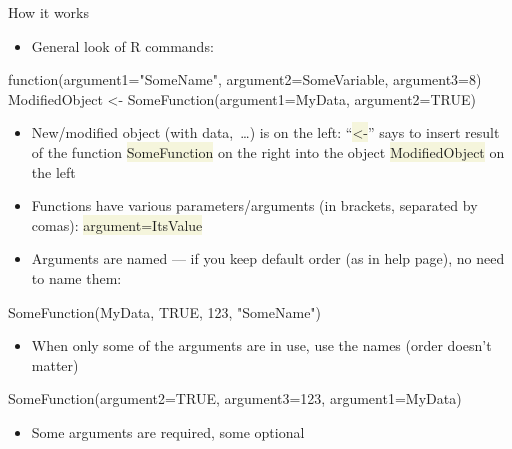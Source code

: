 \documentclass[compress, xelatex, 11pt, xcolor=svgnames, aspectratio=169,
	hyperref={
		bookmarks=true,
		unicode=true,
		colorlinks=true,
		pdftitle={Molecular data in R},
		plainpages=false,
		pdfauthor={Vojtech Zeisek},
		pdfsubject={Course about phylogeny and evolution in R},
		pdfcreator={XeLaTeX},
		pdfkeywords={R, evolution, phylogeny, molecular data},
		linkcolor=Crimson, %
		anchorcolor=Magenta, %
		citecolor=Magenta, %
		filecolor=Magenta, %
		menucolor=Magenta, %
		urlcolor=DodgerBlue, %
		},
	url={hyphens, lowtilde} %
	]{beamer}
\renewcommand{\texttt}[1]{\colorbox{Beige}{{\ttfamily #1}}}
\begin{document}
\begin{frame}[fragile]{How it works}
	\begin{itemize}
		\item General look of R commands:
	\end{itemize}
	\begin{spluscode}
    function(argument1="SomeName", argument2=SomeVariable, argument3=8)
    ModifiedObject <- SomeFunction(argument1=MyData, argument2=TRUE)
	\end{spluscode}
	\begin{itemize}
		\item New/modified object (with data,~\ldots) is on the left: \enquote{\texttt{<-}} says to insert result of the function \texttt{SomeFunction} on the right into the object \texttt{ModifiedObject} on the left
		\item Functions have various parameters/arguments (in brackets, separated by comas): \texttt{argument=ItsValue}
		\item Arguments are named --- if you keep default order (as in help page), no need to name them:
	\end{itemize}
	\begin{spluscode}
    SomeFunction(MyData, TRUE, 123, "SomeName")
	\end{spluscode}
	\begin{itemize}
		\item When only some of the arguments are in use, use the names (order doesn't matter)
	\end{itemize}
	\begin{spluscode}
    SomeFunction(argument2=TRUE, argument3=123, argument1=MyData)
	\end{spluscode}
	\begin{itemize}
		\item Some arguments are required, some optional
	\end{itemize}
\end{frame}
\end{document}
